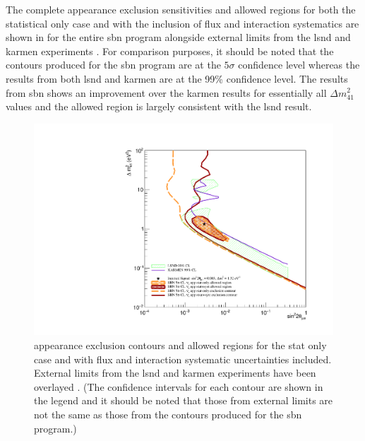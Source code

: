 The complete \nue appearance exclusion sensitivities and allowed regions for both the statistical only case and with the inclusion of flux and interaction systematics are shown in  for the entire \gls{sbn} program alongside external limits from the \gls{lsnd} and \gls{karmen} experiments \cite{LSND_KARMEN_nue_app_contour}. For comparison purposes, it should be noted that the contours produced for the \gls{sbn} program are at the $5\sigma$ confidence level whereas the results from both \gls{lsnd} and \gls{karmen} are at the 99\% confidence level. The results from \gls{sbn} shows an improvement over the \gls{karmen} results for essentially all $\Delta m^2_{41}$ values and the allowed region is largely consistent with the \gls{lsnd} result. 


\begin{figure}[h!]
    \centering
    \includegraphics[width = \largefigwidth]{figures-chap6/overlays/valor_overlays_nue_app.pdf}
    \caption[\nue appearance contours with external limits.]{\nue appearance exclusion contours and allowed regions for the stat only case and with flux and interaction systematic uncertainties included. External limits from the \gls{lsnd} and \gls{karmen} experiments have been overlayed \cite{LSND_KARMEN_nue_app_contour}. (The confidence intervals for each contour are shown in the legend and it should be noted that those from external limits are not the same as those from the contours produced for the \gls{sbn} program.)}
    \label{fig:nue_app_global_sensitivity}
\end{figure}


\clearpage


